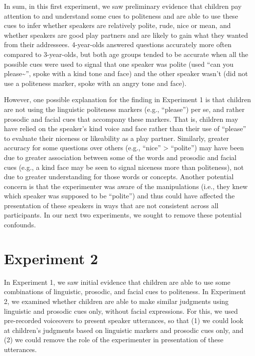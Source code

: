 \documentclass[10pt, letterpaper]{article}
\begin{document}
In sum, in this first experiment, we saw preliminary evidence that
children pay attention to and understand some cues to politeness and are
able to use these cues to infer whether speakers are relatively polite,
rude, nice or mean, and whether speakers are good play partners and are
likely to gain what they wanted from their addressees. 4-year-olds
answered questions accurately more often compared to 3-year-olds, but
both age groups tended to be accurate when all the possible cues were
used to signal that one speaker was polite (used ``can you
please\textasciitilde{}'', spoke with a kind tone and face) and the
other speaker wasn't (did not use a politeness marker, spoke with an
angry tone and face).

However, one possible explanation for the finding in Experiment 1 is
that children are not using the linguistic politeness markers (e.g.,
``please'') per se, and rather prosodic and facial cues that accompany
these markers. That is, children may have relied on the speaker's kind
voice and face rather than their use of ``please'' to evaluate their
niceness or likeability as a play partner. Similarly, greater accuracy
for some questions over others (e.g., ``nice'' \textgreater{}
``polite'') may have been due to greater association between some of the
words and prosodic and facial cues (e.g., a kind face may be seen to
signal niceness more than politeness), not due to greater understanding
for those words or concepts. Another potential concern is that the
experimenter was aware of the manipulations (i.e., they knew which
speaker was supposed to be ``polite'') and thus could have affected the
presentation of these speakers in ways that are not consistent across
all participants. In our next two experiments, we sought to remove these
potential confounds.

\section{Experiment 2}\label{experiment-2}

In Experiment 1, we saw initial evidence that children are able to use
some combinations of linguistic, prosodic, and facial cues to
politeness. In Experiment 2, we examined whether children are able to
make similar judgments using linguistic and prosodic cues only, without
facial expressions. For this, we used pre-recorded voiceovers to present
speaker utterances, so that (1) we could look at children's judgments
based on linguistic markers and prosodic cues only, and (2) we could
remove the role of the experimenter in presentation of these utterances.
\end{document}
